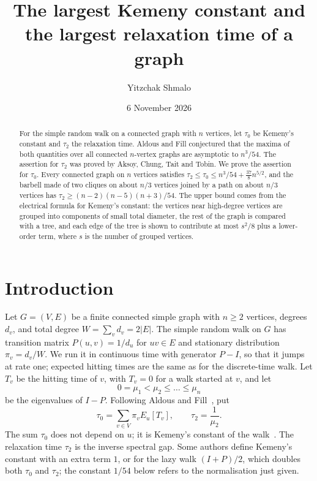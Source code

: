 \documentclass[11pt]{amsart}
\title[The largest Kemeny constant of a graph]{The largest Kemeny constant and the largest relaxation time of a graph}
\author{Yitzchak Shmalo}
\date{6 November 2026}
\theoremstyle{definition}
\theoremstyle{remark}
\numberwithin{equation}{section}
\begin{document}
\begin{abstract}
For the simple random walk on a connected graph with $n$ vertices, let $\tau_0$ be Kemeny's constant and $\tau_2$ the relaxation time. Aldous and Fill conjectured that the maxima of both quantities over all connected $n$-vertex graphs are asymptotic to $n^3/54$. The assertion for $\tau_2$ was proved by Aksoy, Chung, Tait and Tobin. We prove the assertion for $\tau_0$. Every connected graph on $n$ vertices satisfies $\tau_2\le\tau_0\le n^3/54+\tfrac{37}{8}n^{5/2}$, and the barbell made of two cliques on about $n/3$ vertices joined by a path on about $n/3$ vertices has $\tau_2\ge(n-2)(n-5)(n+3)/54$. The upper bound comes from the electrical formula for Kemeny's constant: the vertices near high-degree vertices are grouped into components of small total diameter, the rest of the graph is compared with a tree, and each edge of the tree is shown to contribute at most $s^2/8$ plus a lower-order term, where $s$ is the number of grouped vertices.
\end{abstract}
\maketitle

\section{Introduction}\label{sec:intro}

Let $G=(V,E)$ be a finite connected simple graph with $n\ge2$ vertices, degrees $d_v$, and total degree $W=\sum_v d_v=2|E|$. The simple random walk on $G$ has transition matrix $P(u,v)=1/d_u$ for $uv\in E$ and stationary distribution $\pi_v=d_v/W$. We run it in continuous time with generator $P-I$, so that it jumps at rate one; expected hitting times are the same as for the discrete-time walk. Let $T_v$ be the hitting time of $v$, with $T_v=0$ for a walk started at $v$, and let
\[
0=\mu_1<\mu_2\le\dots\le\mu_n
\]
be the eigenvalues of $I-P$. Following Aldous and Fill~\cite{AF}, put
\[
\tau_0=\sum_{v\in V}\pi_v E_u[T_v],\qquad \tau_2=\frac1{\mu_2}.
\]
The sum $\tau_0$ does not depend on $u$; it is Kemeny's constant of the walk~\cite{KS}. The relaxation time $\tau_2$ is the inverse spectral gap. Some authors define Kemeny's constant with an extra term $1$, or for the lazy walk $(I+P)/2$, which doubles both $\tau_0$ and $\tau_2$; the constant $1/54$ below refers to the normalisation just given.
\end{document}
